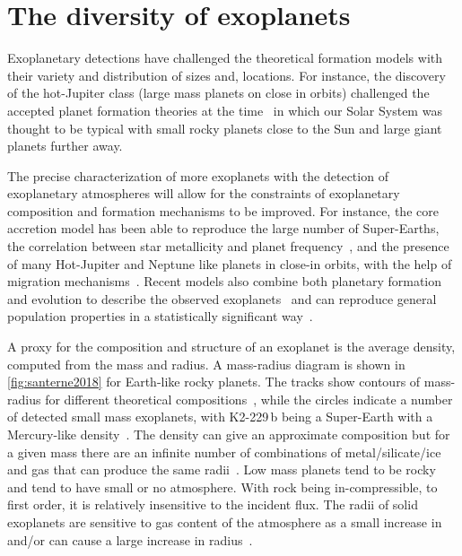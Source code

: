 
\section{The diversity of exoplanets}
\label{sec:exoplanet_diversity}
Exoplanetary detections have challenged the theoretical formation models with their variety and distribution of sizes and, locations.
For instance, the discovery of the hot-Jupiter class (large mass planets on close in orbits) challenged the accepted planet formation theories at the time~\citep[.e.g][]{pollack_formation_1996, boss_giant_1997} in which our Solar System was thought to be typical with small rocky planets close to the Sun and large giant planets further away.

The precise characterization of more exoplanets with the detection of exoplanetary atmospheres will allow for the constraints of exoplanetary composition and formation mechanisms to be improved.
For instance, the core accretion model has been able to reproduce the large number of Super-Earths, the correlation between star metallicity and planet frequency~\citep[e.g.][]{santos_spectroscopic_2004, fischer_planetmetallicity_2005}, and the presence of many Hot-Jupiter and Neptune like planets in close-in orbits, with the help of migration mechanisms~\citep[e.g.][]{triaud_exoplanets_2016}.
Recent models also combine both planetary formation and evolution to describe the observed exoplanets~\citep[e.g.][]{mordasini_characterization_2012} and can reproduce general population properties in a statistically significant way~\citep{mordasini_extrasolar_2009}.

A proxy for the composition and structure of an exoplanet is the average density, computed from the mass and radius.
A mass-radius diagram is shown in \cref{fig:santerne2018} for Earth-like rocky planets.
The tracks show contours of mass-radius for different theoretical compositions~\citep{brugger_constraints_2017}, while the circles indicate a number of detected small mass exoplanets, with {K2-229\,b} being a Super-Earth with a Mercury-like density~\citep{santerne_earthsized_2018}.
The density can give an approximate composition but for a given mass there are an infinite number of combinations of metal/silicate/ice and gas that can produce the same radii~\citep[e.g.][]{seager_massradius_2007}.
Low mass planets tend to be rocky and tend to have small or no atmosphere.
With rock being in-compressible, to first order, it is relatively insensitive to the incident flux.
The radii of solid exoplanets are sensitive to gas content of the atmosphere as a small increase in  and/or  can cause a large increase in radius~\citep{adams_ocean_2008}.

